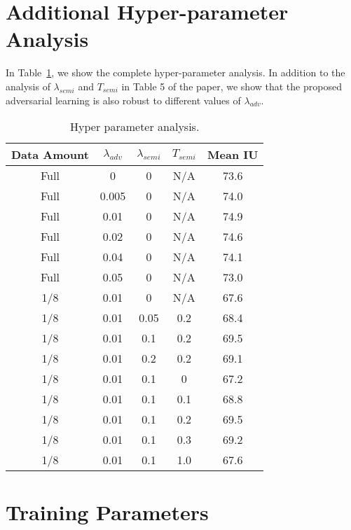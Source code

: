 \documentclass{bmvc2k}
\begin{document}
	\section{Additional Hyper-parameter Analysis}
	In Table~\ref{table: hyper}, we show the complete hyper-parameter analysis.
	In addition to the analysis of $\lambda_{semi}$ and $T_{semi}$ in Table 5 of the paper, we show that the proposed adversarial learning is also robust to different values of $\lambda_{adv}$.
	
	
	\begin{table}[h]
		\caption{Hyper parameter analysis.}
		\small
		\vspace{2mm}
		\label{table: hyper}
		\centering
		\begin{tabular}{ccccc}
			\toprule
			Data Amount & $\lambda_{adv}$ & $\lambda_{semi}$ & $T_{semi}$ & Mean IU\\
			\midrule
			Full & 0 & 0 & N/A & 73.6 \\
			Full&0.005&	0&	N/A	&74.0\\
			Full&0.01&	0&	N/A	&74.9\\
			Full&0.02&	0&	N/A	&74.6\\
			Full&0.04&	0&	N/A	&74.1\\
			Full&0.05& 0 & N/A & 73.0 \\
			\midrule
			1/8&0.01&	0&	N/A	&67.6\\
			1/8	&0.01&	0.05&	0.2&	68.4\\
			1/8	&0.01&	0.1&	0.2&	69.5\\
			1/8	&0.01&	0.2&	0.2&	69.1\\
			\midrule
			1/8	&0.01&	0.1	&0&	 67.2\\
			1/8	&0.01&	0.1	&0.1&	68.8\\
			1/8	&0.01&	0.1&	0.2&	69.5\\
			1/8	&0.01&	0.1	&0.3&	69.2\\
			1/8	&0.01&	0.1	&1.0&	67.6\\
			\bottomrule
		\end{tabular}
	\end{table}
	
	
	\section{Training Parameters}
	
\end{document}

